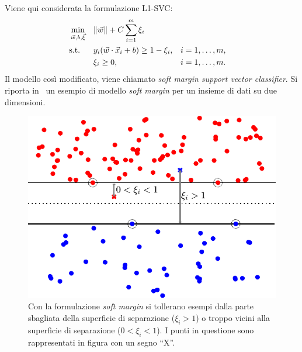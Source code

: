 Viene qui considerata la formulazione L1-SVC:
\begin{equation}
\label{eq:svc:softmargin:primal}
\begin{aligned}
& \min_{\Vec{w},b,\Vec{\xi}}    && \|\Vec{w}\| + C\sum_{i=1}^{m}\xi_i\\
& \textrm{s.t.} && y_i(\Vec{w}\cdot\Vec{x}_i + b) \geq 1 - \xi_i, &&  i=1,\dots,m, \\
&               && \xi_i \geq 0,                 &&  i=1,\dots,m.\\
\end{aligned}
\end{equation}
Il modello così modificato, viene chiamato \emph{soft margin support vector classifier}.
Si riporta in~ un esempio di modello \emph{soft margin} per un insieme di dati su due dimensioni.

\begin{figure}
    \centering
    \includegraphics[width=.7\linewidth]{img/soft_margin.pdf}
    \caption{Con la formulazione \emph{soft margin} si tollerano esempi dalla parte sbagliata della superficie di separazione ($\xi_i>1$) o troppo vicini alla superficie di separazione ($0<\xi_i<1$). I punti in questione sono rappresentati in figura con un segno ``X''.}
    \label{fig:soft_margin}
\end{figure}



